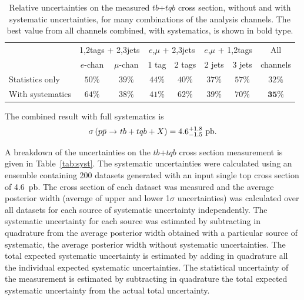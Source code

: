 \begin{table}[!h!tbp]
\begin{center}
\caption{Relative uncertainties on the measured
$tb$+$tqb$ cross section, without and with systematic uncertainties,
for many combinations of the analysis channels. The best value from
all channels combined, with systematics, is shown in bold type.}
\label{meas-errors}
\begin{tabular}{l|cc|cc|cc|c}
& \multicolumn{2}{c|}{1,2tags + 2,3jets}& \multicolumn{2}{c|}{$e$,$\mu$ + 2,3jets}
& \multicolumn{2}{c|}{$e$,$\mu$ + 1,2tags}& All \\
                 &  $e$-chan & $\mu$-chan& 1 tag & 2 tags& 2 jets& 3 jets&channels\\
\hline
Statistics only  &  $50\%$  & $39\%$ & $44\%$ & $40\%$ &  $37\%$  & $57\%$ & $32\%$     \\
With systematics &  $64\%$  & $38\%$ & $41\%$ & $62\%$ &  $39\%$  & $70\%$ & $\mathbf{35\%}$     \\
\end{tabular}
\vspace{-0.1in}
\end{center}
\end{table}

The combined result with full systematics is
$$
\sigma\left({\mbox{$p\bar{p}$}}{\mbox{ $\rightarrow$ }}tb+tqb+X\right)
= 4.6 ^{+1.8}_{-1.5}~{\rm pb}.
$$

\noindent A breakdown of the uncertainties on the $tb$+$tqb$ cross section measurement is given in Table~\ref{tab:syst}. The systematic uncertainties were calculated using an ensemble containing 200 datasets generated with an input single top cross section of 4.6~pb. The cross section of each dataset was measured and the average posterior width (average of upper and lower 1$\sigma$ uncertainties) was calculated over all datasets for each source of systematic uncertainty independently. The systematic uncertainty for each source was estimated by subtracting in quadrature from the average posterior width obtained with a particular source of systematic, the average posterior width without systematic uncertainties. The total expected systematic uncertainty is estimated by adding in quadrature all the individual expected systematic uncertainties.  The statistical uncertainty of the measurement is estimated by subtracting in quadrature the total expected systematic uncertainty from the actual total uncertainty.

